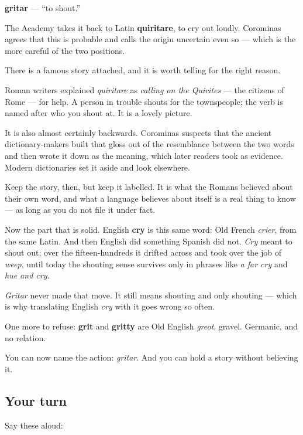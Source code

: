 \begin{cousinweb}
\textbf{gritar} — \textquotedblleft{}to shout.\textquotedblright{}

The Academy takes it back to Latin \textbf{quiritare}, to cry out loudly. Corominas agrees that this is probable and calls the origin uncertain even so — which is the more careful of the two positions.

There is a famous story attached, and it is worth telling for the right reason.

Roman writers explained \emph{quiritare} as \emph{calling on the Quirites} — the citizens of Rome — for help. A person in trouble shouts for the townspeople; the verb is named after who you shout at. It is a lovely picture.

It is also almost certainly backwards. Corominas suspects that the ancient dictionary-makers built that gloss out of the resemblance between the two words and then wrote it down as the meaning, which later readers took as evidence. Modern dictionaries set it aside and look elsewhere.

Keep the story, then, but keep it labelled. It is what the Romans believed about their own word, and what a language believes about itself is a real thing to know — as long as you do not file it under fact.

Now the part that is solid. English \textbf{cry} is this same word: Old French \emph{crier}, from the same Latin. And then English did something Spanish did not. \emph{Cry} meant to shout out; over the fifteen-hundreds it drifted across and took over the job of \emph{weep}, until today the shouting sense survives only in phrases like \emph{a far cry} and \emph{hue and cry}.

\emph{Gritar} never made that move. It still means shouting and only shouting — which is why translating English \emph{cry} with it goes wrong so often.

One more to refuse: \textbf{grit} and \textbf{gritty} are Old English \emph{greot}, gravel. Germanic, and no relation.
\end{cousinweb}

\begin{grammarlens}[title={What you've built}]
You can now name the action: \emph{gritar}. And you can hold a story without believing it.
\end{grammarlens}

\subsection*{Your turn}
Say these aloud:


